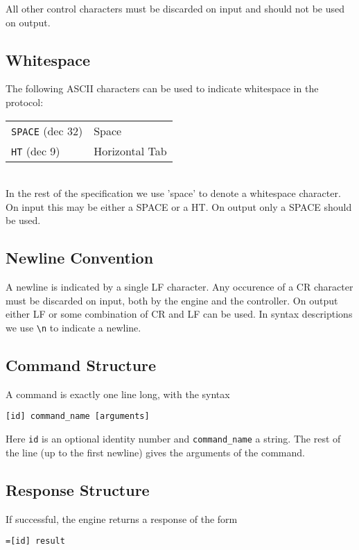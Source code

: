 \documentclass[a4paper]{article}
\begin{document}
All other control characters must be discarded on input and should not
be used on output.

\subsection{Whitespace}
\label{sec:whitespace}
The following ASCII characters can be used to indicate whitespace in
the protocol:\\

\begin{tabular}{ll}
\texttt{SPACE} (dec 32)  & Space \\
\texttt{HT} (dec 9)      & Horizontal Tab \\
\end{tabular}\\

In the rest of the specification we use 'space' to denote a whitespace
character. On input this may be either a SPACE or a HT. On output only a
SPACE should be used.

\subsection{Newline Convention}
\label{sec:newline-convention}
A newline is indicated by a single LF character. Any occurence of a CR
character must be discarded on input, both by the engine and the
controller. On output either LF or some combination of CR and LF can
be used. In syntax descriptions we use \verb|\n| to indicate a newline.

\subsection{Command Structure}
A command is exactly one line long, with the syntax

\begin{verbatim}
[id] command_name [arguments]
\end{verbatim}

Here \texttt{id} is an optional identity number and
\texttt{command\_name} a string. The rest of the line (up to the first
newline) gives the arguments of the command.

\subsection{Response Structure}
If successful, the engine returns a response of the form

\begin{verbatim}
=[id] result
\end{verbatim}
\end{document}
